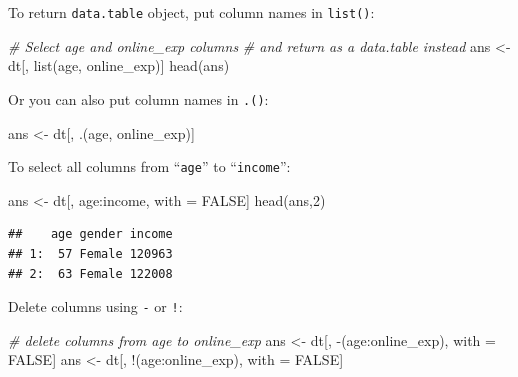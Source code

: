 \documentclass[
  12pt,
]{krantz}
\makeatletter
\newenvironment{Shaded}{\begin{snugshade}}{\end{snugshade}}
\newcommand{\CommentTok}[1]{\textcolor[rgb]{0.37,0.37,0.37}{\textit{#1}}}
\newcommand{\ConstantTok}[1]{\textcolor[rgb]{0,0,0}{#1}}
\newcommand{\DecValTok}[1]{\textcolor[rgb]{0.06,0.06,0.06}{#1}}
\newcommand{\FunctionTok}[1]{\textcolor[rgb]{0,0,0}{#1}}
\newcommand{\NormalTok}[1]{#1}
\newcommand{\OtherTok}[1]{\textcolor[rgb]{0.37,0.37,0.37}{#1}}
\newcommand{\SpecialCharTok}[1]{\textcolor[rgb]{0,0,0}{#1}}
\newenvironment{kframe}{%
\medskip{}
\setlength{\fboxsep}{.8em}
 \def\at@end@of@kframe{}%
 \ifinner\ifhmode%
  \def\at@end@of@kframe{\end{minipage}}%
  \begin{minipage}{\columnwidth}%
 \fi\fi%
 \def\FrameCommand##1{\hskip\@totalleftmargin \hskip-\fboxsep
 \colorbox{shadecolor}{##1}\hskip-\fboxsep
     \hskip-\linewidth \hskip-\@totalleftmargin \hskip\columnwidth}%
 \MakeFramed {\advance\hsize-\width
   \@totalleftmargin\z@ \linewidth\hsize
   \@setminipage}}%
 {\par\unskip\endMakeFramed%
 \at@end@of@kframe}
\renewenvironment{Shaded}{\begin{kframe}}{\end{kframe}}
\makeatother
\begin{document}
To return \texttt{data.table} object, put column names in \texttt{list()}:

\begin{Shaded}
\begin{Highlighting}[]
\CommentTok{\# Select age and online\_exp columns }
\CommentTok{\# and return as a data.table instead}
\NormalTok{ans }\OtherTok{\textless{}{-}}\NormalTok{ dt[, }\FunctionTok{list}\NormalTok{(age, online\_exp)]}
\FunctionTok{head}\NormalTok{(ans)}
\end{Highlighting}
\end{Shaded}

Or you can also put column names in \texttt{.()}:

\begin{Shaded}
\begin{Highlighting}[]
\NormalTok{ans }\OtherTok{\textless{}{-}}\NormalTok{ dt[, .(age, online\_exp)]}
\end{Highlighting}
\end{Shaded}

To select all columns from ``\texttt{age}'' to ``\texttt{income}'':

\begin{Shaded}
\begin{Highlighting}[]
\NormalTok{ans }\OtherTok{\textless{}{-}}\NormalTok{ dt[, age}\SpecialCharTok{:}\NormalTok{income, with }\OtherTok{=} \ConstantTok{FALSE}\NormalTok{]}
\FunctionTok{head}\NormalTok{(ans,}\DecValTok{2}\NormalTok{)}
\end{Highlighting}
\end{Shaded}

\begin{verbatim}
##    age gender income
## 1:  57 Female 120963
## 2:  63 Female 122008
\end{verbatim}

Delete columns using \texttt{-} or \texttt{!}:

\begin{Shaded}
\begin{Highlighting}[]
\CommentTok{\# delete columns from  age to online\_exp}
\NormalTok{ans }\OtherTok{\textless{}{-}}\NormalTok{ dt[, }\SpecialCharTok{{-}}\NormalTok{(age}\SpecialCharTok{:}\NormalTok{online\_exp), with }\OtherTok{=} \ConstantTok{FALSE}\NormalTok{]}
\NormalTok{ans }\OtherTok{\textless{}{-}}\NormalTok{ dt[, }\SpecialCharTok{!}\NormalTok{(age}\SpecialCharTok{:}\NormalTok{online\_exp), with }\OtherTok{=} \ConstantTok{FALSE}\NormalTok{]}
\end{Highlighting}
\end{Shaded}
\end{document}
